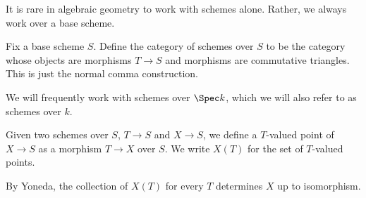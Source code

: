 It is rare in algebraic geometry to work with schemes alone. Rather, we always work
over a base scheme.

Fix a base scheme $S$. Define the category of schemes over $S$ to be the
category whose objects are morphisms $T\to S$ and morphisms are commutative
triangles. This is just the normal comma construction.

We will frequently work with schemes over $\Spec k$, which we will also refer to
as schemes over $k$.

Given two schemes over $S$, $T\to S$ and $X\to S$, we define a $T$-valued point
of $X\to S$ as a morphism $T\to X$ over $S$. We write $X(T)$ for the set of
$T$-valued points.

By Yoneda, the collection of $X(T)$ for every $T$ determines $X$ up to isomorphism.
